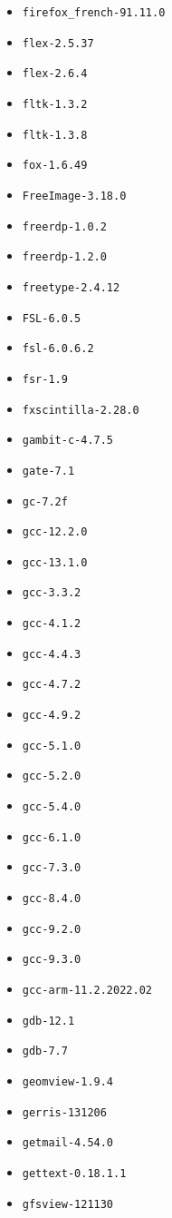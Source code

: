 \begin{multicols}{3}
\begin{itemize}
\item \verb|firefox_french-91.11.0|
\item \verb|flex-2.5.37|
\item \verb|flex-2.6.4|
\item \verb|fltk-1.3.2|
\item \verb|fltk-1.3.8|
\item \verb|fox-1.6.49|
\item \verb|FreeImage-3.18.0|
\item \verb|freerdp-1.0.2|
\item \verb|freerdp-1.2.0|
\item \verb|freetype-2.4.12|
\item \verb|FSL-6.0.5|
\item \verb|fsl-6.0.6.2|
\item \verb|fsr-1.9|
\item \verb|fxscintilla-2.28.0|
\item \verb|gambit-c-4.7.5|
\item \verb|gate-7.1|
\item \verb|gc-7.2f|
\item \verb|gcc-12.2.0|
\item \verb|gcc-13.1.0|
\item \verb|gcc-3.3.2|
\item \verb|gcc-4.1.2|
\item \verb|gcc-4.4.3|
\item \verb|gcc-4.7.2|
\item \verb|gcc-4.9.2|
\item \verb|gcc-5.1.0|
\item \verb|gcc-5.2.0|
\item \verb|gcc-5.4.0|
\item \verb|gcc-6.1.0|
\item \verb|gcc-7.3.0|
\item \verb|gcc-8.4.0|
\item \verb|gcc-9.2.0|
\item \verb|gcc-9.3.0|
\item \verb|gcc-arm-11.2.2022.02|
\item \verb|gdb-12.1|
\item \verb|gdb-7.7|
\item \verb|geomview-1.9.4|
\item \verb|gerris-131206|
\item \verb|getmail-4.54.0|
\item \verb|gettext-0.18.1.1|
\item \verb|gfsview-121130|

\end{itemize}
\end{multicols}
